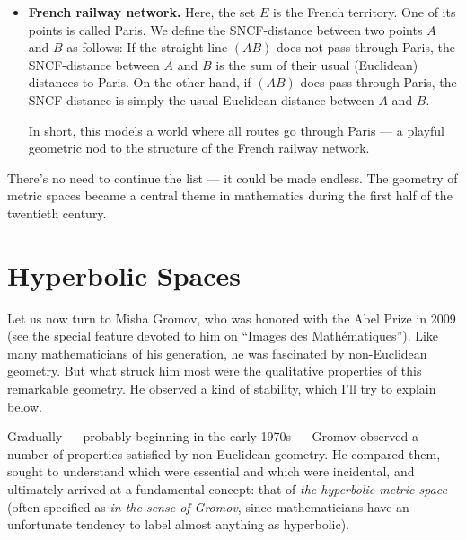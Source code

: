 \documentclass{amsart}
\begin{document}
\begin{itemize}[left=0pt]
\item \textbf{French railway network.}  Here, the set $E$ is the
  French territory. One of its points is called Paris. We define the
  SNCF-distance%
  between two points $A$ and $B$ as follows: If the straight line
  $(AB)$ does not pass through Paris, the SNCF-distance between $A$
  and $B$ is the sum of their usual (Euclidean) distances to Paris.
  On the other hand, if $(AB)$ does pass through Paris, the
  SNCF-distance is simply the usual Euclidean distance between $A$ and
  $B$.

  In short, this models a world where all routes go through Paris --- a
  playful geometric nod to the structure of the French railway
  network.
\end{itemize}
\medskip
There’s no need to continue the list --- it could be made endless. The
geometry of metric spaces became a central theme in mathematics during
the first half of the twentieth century.

\section{Hyperbolic Spaces}

Let us now turn to Misha Gromov, who was honored with the Abel Prize
in 2009 (see the special feature%
devoted to him on ``Images des Mathématiques''). Like many
mathematicians of his generation, he was fascinated by non-Euclidean
geometry. But what struck him most were the qualitative properties of
this remarkable geometry. He observed a kind of stability, which I’ll
try to explain below.

Gradually --- probably beginning in the early 1970s --- Gromov
observed a number of properties satisfied by non-Euclidean
geometry. He compared them, sought to understand which were essential
and which were incidental, and ultimately arrived at a fundamental
concept: that of \textit{the hyperbolic metric space} (often specified as \textit{in
the sense of Gromov}, since mathematicians have an unfortunate
tendency to label almost anything as hyperbolic).
\end{document}
